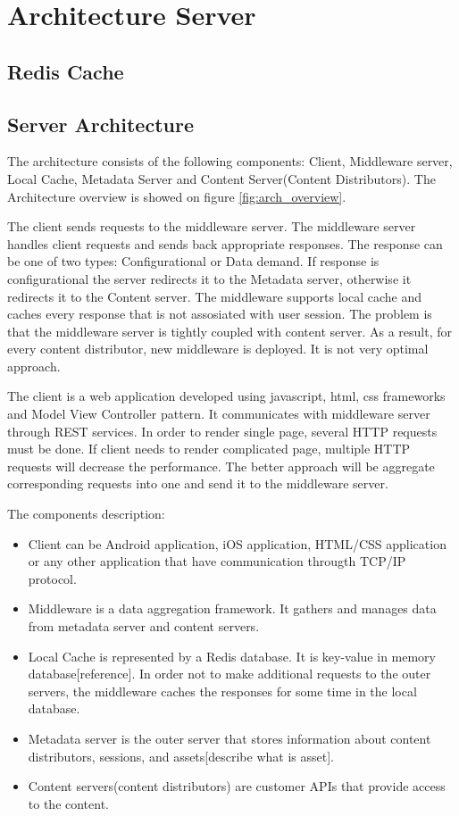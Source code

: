 \section{Architecture Server}

\subsection{Redis Cache}


\subsection{Server Architecture}

The architecture consists of the following components: Client, Middleware server, Local Cache, Metadata Server and Content Server(Content Distributors). The Architecture overview is showed on figure \ref{fig:arch_overview}. 

The client sends requests to the middleware server. The middleware server handles client requests and sends back appropriate responses. The response can be one of two types: Configurational or Data demand. If response is configurational the server redirects it to the Metadata server, otherwise it redirects it to the Content server. The middleware supports local cache and caches every response that is not assosiated with user session. The problem is that the middleware server is tightly coupled with content server. As a result, for every content distributor, new middleware is deployed. It is not very optimal approach.

The client is a web application developed using javascript, html, css frameworks and Model View Controller pattern. It communicates with middleware server through REST services. In order to render single page, several HTTP requests must be done. If client needs to render complicated page, multiple HTTP requests will decrease the performance. The better approach will be aggregate corresponding requests into one and send it to the middleware server.    

The components description:

\begin{itemize}
	\item Client can be Android application, iOS application, HTML/CSS application or any other application that have communication througth TCP/IP protocol.
    \item Middleware is a data aggregation framework. It gathers and manages data from metadata server and content servers.
    \item Local Cache is represented by a Redis database. It is key-value in memory database[reference]. In order not to make additional requests to the outer servers, the middleware caches the responses for some time in the local database.
    \item Metadata server is the outer server that stores information about content distributors, sessions, and assets[describe what is asset].
    \item Content servers(content distributors) are customer APIs that provide access to the content.

\end{itemize}


